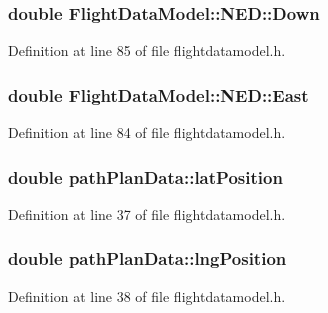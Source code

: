 \hypertarget{group___path_gae7f07300d5df11f628d4be7fefddce05}{
\subsubsection[{\-Down}]{\setlength{\rightskip}{0pt plus 5cm}double \-Flight\-Data\-Model\-::\-N\-E\-D\-::\-Down}}\label{group___path_gae7f07300d5df11f628d4be7fefddce05}


\-Definition at line 85 of file flightdatamodel.\-h.

\hypertarget{group___path_ga61ad0d9a38807fe21d456dc84cdb80d7}{
\subsubsection[{\-East}]{\setlength{\rightskip}{0pt plus 5cm}double \-Flight\-Data\-Model\-::\-N\-E\-D\-::\-East}}\label{group___path_ga61ad0d9a38807fe21d456dc84cdb80d7}


\-Definition at line 84 of file flightdatamodel.\-h.

\hypertarget{group___path_ga741da9e938717a4dba1a1b28afc94d07}{
\subsubsection[{lat\-Position}]{\setlength{\rightskip}{0pt plus 5cm}double {\bf path\-Plan\-Data\-::lat\-Position}}}\label{group___path_ga741da9e938717a4dba1a1b28afc94d07}


\-Definition at line 37 of file flightdatamodel.\-h.

\hypertarget{group___path_ga28464ee2b2537b0bc670193bc29627b7}{
\subsubsection[{lng\-Position}]{\setlength{\rightskip}{0pt plus 5cm}double {\bf path\-Plan\-Data\-::lng\-Position}}}\label{group___path_ga28464ee2b2537b0bc670193bc29627b7}


\-Definition at line 38 of file flightdatamodel.\-h.

